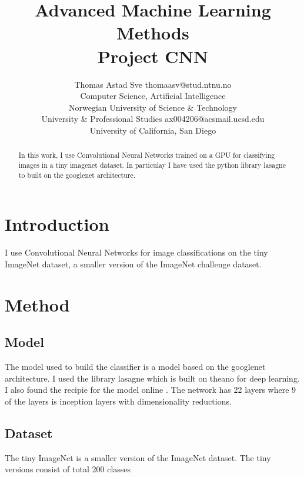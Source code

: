 \documentclass[twoside,11pt]{article}
\begin{document}
\title{Advanced Machine Learning Methods \\ Project CNN}

\author{\name Thomas Astad Sve \email thomaasv@stud.ntnu.no \\
         \addr Computer Science, Artificial Intelligence\\
       Norwegian University of Science \& Technology\\
       \addr University \& Professional Studies \email ax004206@acsmail.ucsd.edu\\
       University of California, San Diego\\}

\maketitle

\begin{abstract}
  In this work, I use Convolutional Neural Networks trained on a GPU for classifying images in a tiny imagenet dataset. In particulay I have used the python library lasagne \cite{lasagne} to built on the googlenet \cite{googlenet} architecture.
  
\end{abstract}
\section{Introduction}
I use Convolutional Neural Networks for image classifications on the tiny ImageNet dataset, a smaller version of the ImageNet \cite{imagenet} challenge dataset.
\section{Method}
\subsection{Model}
The model used to build the classifier is a model based on the googlenet architecture. I used the library lasagne \cite{lasagne} which is built on theano for deep learning. I also found the recipie for the model online \cite{googlenet-recipe}. The network has 22 layers where 9 of the layers is inception layers with dimensionality reductions. 
\subsection{Dataset}
The tiny ImageNet is a smaller version of the ImageNet dataset. The tiny versions consist of total 200 classes 
\end{document}

